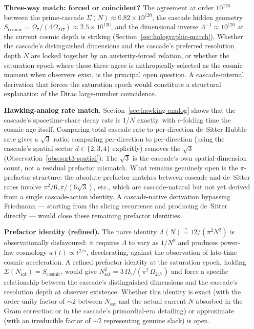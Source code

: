 \documentclass[11pt,a4paper]{article}
\begin{document}
\textbf{Three-way match: forced or coincident?} The agreement at
order $10^{120}$ between the prime-cascade $\Sigma(N) \approx 0.82
\times 10^{120}$, the cascade hidden geometry
$S_{\mathrm{cosmic}} = \Omega_7/(4\Omega_{217}) \approx 2.5 \times
10^{120}$, and the dimensional inverse $\Lambda^{-1} \approx
10^{120}$ at the current cosmic depth is striking
(Section~\ref{sec:holographic-match}). Whether the cascade's
distinguished dimensions and the cascade's preferred resolution depth
$N$ are locked together by an austerity-forced relation, or whether
the saturation epoch where these three agree is anthropically
selected as the cosmic moment when observers exist, is the principal
open question. A cascade-internal derivation that forces the
saturation epoch would constitute a structural explanation of the
Dirac large-number coincidence.

\textbf{Hawking-analog rate match.}
Section~\ref{sec:hawking-analog} shows that the cascade's
spacetime-share decay rate is $1/N$ exactly, with e-folding time
the cosmic age itself. Comparing total cascade rate to per-direction
de~Sitter Hubble rate gives a $\sqrt{3}$ ratio; comparing
per-direction to per-direction (using the cascade's spatial sector
$d \in \{2, 3, 4\}$ explicitly) removes the $\sqrt{3}$
(Observation~\ref{obs:sqrt3-spatial}). The $\sqrt{3}$ is the cascade's
own spatial-dimension count, not a residual prefactor mismatch. What
remains genuinely open is the $\pi$-prefactor structure: the absolute
prefactor matches between cascade and de~Sitter rates involve
$\pi^2/6, \pi/(6\sqrt{3})$, etc., which are cascade-natural but not
yet derived from a single cascade-action identity. A cascade-native
derivation bypassing Friedmann --- starting from the slicing
recurrence and producing de~Sitter directly --- would close these
remaining prefactor identities.

\textbf{Prefactor identity (refined).} The naive identity
$\Lambda(N) \stackrel{?}{=} 12/(\pi^2 N^2)$ is observationally
disfavoured: it requires $\Lambda$ to vary as $1/N^2$ and produces
power-law cosmology $a(t) \propto t^{2/\pi}$, decelerating, against
the observation of late-time cosmic acceleration. A refined
prefactor identity at the saturation epoch, holding
$\Sigma(N_{\mathrm{sat}}) = S_{\mathrm{cosmic}}$, would give
$N_{\mathrm{sat}}^2 = 3\,\Omega_7/(\pi^2\, \Omega_{217})$ and force a
specific relationship between the cascade's distinguished dimensions
and the cascade's resolution depth at observer existence. Whether
this identity is exact (with the order-unity factor of $\sim 2$
between $N_{\mathrm{sat}}$ and the actual current $N$ absorbed in
the Gram correction or in the cascade's primordial-era detailing) or
approximate (with an irreducible factor of $\sim 2$ representing
genuine slack) is open.
\end{document}
